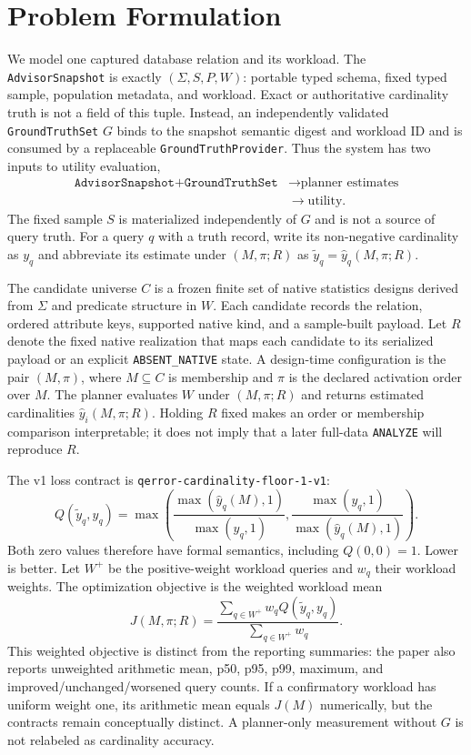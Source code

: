 \section{Problem Formulation}

We model one captured database relation and its workload. The
\texttt{AdvisorSnapshot} is exactly $(\Sigma,S,P,W)$: portable typed schema,
fixed typed sample, population metadata, and workload. Exact or authoritative
cardinality truth is not a field of this tuple. Instead, an independently
validated \texttt{GroundTruthSet} $G$ binds to the snapshot semantic digest and
workload ID and is consumed by a replaceable \texttt{GroundTruthProvider}.
Thus the system has two inputs to utility evaluation,
\[
\begin{aligned}
  \texttt{AdvisorSnapshot} + \texttt{GroundTruthSet}
    &\longrightarrow \text{planner estimates}\\
    &\longrightarrow \text{utility}.
\end{aligned}
\]
The fixed sample $S$ is materialized independently of $G$ and is not a source
of query truth. For a query $q$ with a truth record, write its non-negative
cardinality as $y_q$ and abbreviate its estimate under $(M,\pi;R)$ as
$\tilde y_q=\hat y_q(M,\pi;R)$.

The candidate universe $C$ is a frozen finite set of native statistics
designs derived from $\Sigma$ and predicate structure in $W$. Each candidate
records the relation, ordered attribute keys, supported native kind, and a
sample-built payload. Let $R$ denote the fixed native realization that maps
each candidate to its serialized payload or an explicit
\texttt{ABSENT\_NATIVE} state. A design-time configuration is the pair
$(M,\pi)$, where $M\subseteq C$ is membership and $\pi$ is the declared
activation order over $M$. The planner evaluates $W$ under $(M,\pi;R)$ and
returns estimated cardinalities $\hat y_i(M,\pi;R)$. Holding $R$ fixed makes
an order or membership comparison interpretable; it does not imply that a
later full-data \texttt{ANALYZE} will reproduce $R$.

The v1 loss contract is \texttt{qerror-cardinality-floor-1-v1}:
\[
 Q(\tilde y_q,y_q)=
 \max\left(
   \frac{\max(\hat y_q(M),1)}{\max(y_q,1)},
   \frac{\max(y_q,1)}{\max(\hat y_q(M),1)}
 \right).
\]
Both zero values therefore have formal semantics, including $Q(0,0)=1$.
Lower is better. Let $W^+$ be the positive-weight workload queries and
$w_q$ their workload weights. The optimization objective is the weighted
workload mean
\[
 J(M,\pi;R)=\frac{\sum_{q\in W^+} w_q Q(\tilde y_q,y_q)}
              {\sum_{q\in W^+} w_q}.
\]
This weighted objective is distinct from the reporting summaries: the paper
also reports unweighted arithmetic mean, p50, p95, p99, maximum, and
improved/unchanged/worsened query counts. If a confirmatory workload has
uniform weight one, its arithmetic mean equals $J(M)$ numerically, but the
contracts remain conceptually distinct. A planner-only measurement without
$G$ is not relabeled as cardinality accuracy.

